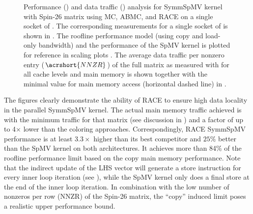 \begin{figure}[t]
 	\caption{Performance () and data traffic () analysis for \acrshort{SymmSpMV} kernel with Spin-26 matrix using \acrshort{MC}, \acrshort{ABMC}, and \acrshort{RACE} on a single socket of \IVB. The corresponding measurements for a single socket of \SKX is shown in . The roofline performance model (using copy and load-only bandwidth) and the performance of the \acrshort{SpMV} kernel is plotted for reference in scaling plots . The average data traffic per nonzero entry ($\acrshort{NNZR}$) of the full matrix as measured with \LIKWID for all cache levels and main memory is shown together with the minimal value for main memory access (horizontal dashed line) in .}
 	\label{fig:motivation_w_RACE}
 \end{figure}
The figures clearly demonstrate the ability of \acrshort{RACE} to ensure high data locality in the parallel \acrshort{SymmSpMV} kernel. The actual main memory traffic achieved is   with the minimum traffic for that matrix (see discussion in ) and a factor of up to 4$\times$ lower than the coloring approaches. Correspondingly, \acrshort{RACE} \acrshort{SymmSpMV} performance is at least $3.3\times$ higher than its best competitor and $25\%$ better than the \acrshort{SpMV} kernel on both architectures. It achieves more than 84\% of the roofline performance limit based on the copy main memory performance. Note that the indirect update of the LHS vector will generate a store instruction for every inner loop iteration (see ), while the \acrshort{SpMV} kernel only does a final store at the end of the inner loop iteration. In combination with the low number of nonzeros per row (\acrshort{NNZR}) of the Spin-26 matrix, the ``copy'' induced limit poses a realistic upper performance bound.  
%

